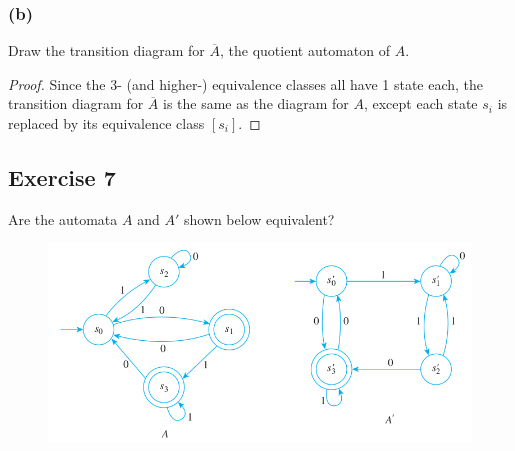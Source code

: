 \documentclass[14pt]{extarticle}
\begin{document}
\subsubsection{(b)}
Draw the transition diagram for \(\overline{A}\), the quotient automaton of \(A\).

\begin{proof}
    Since the 3- (and higher-) equivalence classes all have 1 state each, the transition diagram for \(\overline{A}\) is the
    same as the diagram for \(A\), except each state \(s_i\) is replaced by its equivalence class \([s_i]\).
\end{proof}

\subsection{Exercise 7}
Are the automata \(A\) and \(A'\) shown below equivalent?

\begin{figure}[ht!]
    \centering
    \includegraphics[scale=0.5]{../images/12.3.7.png}
\end{figure}
\end{document}
